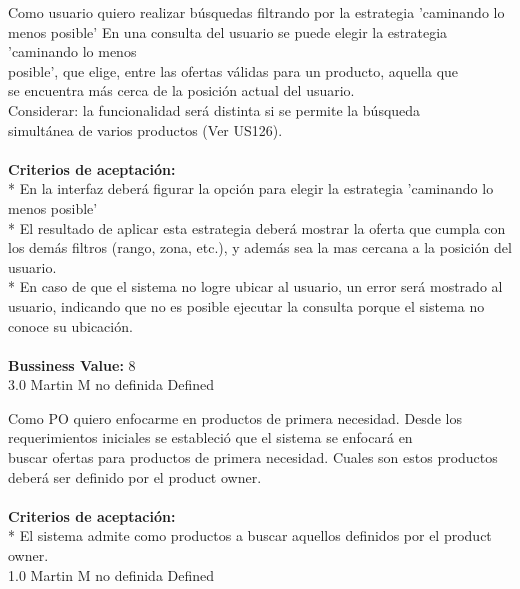\vspace{20pt}

	{Como usuario quiero realizar búsquedas filtrando por la estrategia 'caminando lo menos posible'} %
	{En una consulta del usuario se puede elegir la estrategia 'caminando lo menos\\
posible', que elige, entre las ofertas válidas para un producto, aquella que\\
se encuentra más cerca de la posición actual del usuario.\\
Considerar: la funcionalidad será distinta si se permite la búsqueda\\
simultánea de varios productos (Ver US126).\\
  \\
\textbf{Criterios de aceptación:}\\
* En la interfaz deberá figurar la opción para elegir la estrategia 'caminando lo menos posible'\\
* El resultado de aplicar esta estrategia deberá mostrar la oferta que cumpla con los demás filtros (rango, zona, etc.), y además sea la mas cercana a la posición del usuario.\\
* En caso de que el sistema no logre ubicar al usuario, un error será mostrado al usuario, indicando que no es posible ejecutar la consulta porque el sistema no conoce su ubicación.\\
  \\
\textbf{Bussiness Value:} 8\\
} %
	{} %
	{3.0} %
	{Martin M} %
	{no definida} %
	{Defined} %


\vspace{20pt}

	{Como PO quiero enfocarme en productos de primera necesidad.} %
	{Desde los requerimientos iniciales se estableció que el sistema se enfocará en\\
buscar ofertas para productos de primera necesidad. Cuales son estos productos\\
deberá ser definido por el product owner.\\
  \\
\textbf{Criterios de aceptación:}\\
* El sistema admite como productos a buscar aquellos definidos por el product owner.\\
} %
	{} %
	{1.0} %
	{Martin M} %
	{no definida} %
	{Defined} %

